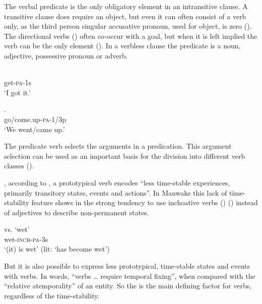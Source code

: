 The verbal predicate is the only obligatory element in an intransitive clause. A transitive clause does require an object, but even it can often consist of a verb only, as the third person singular accusative pronoun, used for object, is zero (). The directional verbs () often co-occur with a goal, but when it is left implied the verb can be the only element (). In a verbless clause the predicate is a noun, adjective, possessive pronoun or adverb. 

\ea%
\label{ex:x177}
\gll {} \\
get-\textsc{pa}-1s\\
\glt`I got it.'
\z

\ea%
\label{ex:x178}
\gll {}. \\
go/come.up-\textsc{pa}-1/3p \\
\glt`We went/came up.' 
\z

The predicate verb selects the arguments in a predication. This argument selection can be used as an important basis for the division into different verb classes ().

, according to \citet[64]{Givon}, a prototypical verb encodes ``{less time-stable experiences, primarily transitory states, events and actions}''. In Mauwake this lack of time-stability feature shows in the strong tendency to use inchoative verbs () () instead of adjectives to describe non-permanent states. 

\ea%
\label{ex:x179}
\gll {} vs.  `wet' \\
wet-\textsc{inch}-\textsc{pa}-3s \\
\glt`(it) is wet' (lit: `has become wet') 
\z

But it is also possible to express less prototypical, time-stable states and events with verbs. In  words, ``{verbs {\dots} require temporal fixing''}, when compared with the ``{relative atemporality}'' of an entity. So the  is the main defining factor for verbs, regardless of the time-stability.

